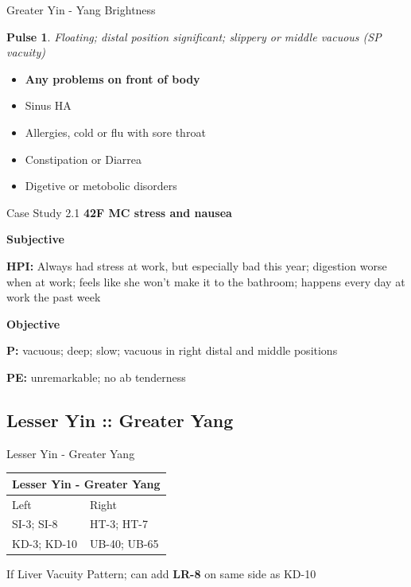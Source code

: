\begin{frame}{Greater Yin - Yang Brightness}
\newtheorem{pulse}{Pulse}

\begin{pulse}
Floating; distal position significant; slippery or middle vacuous (SP vacuity)
\end{pulse}

\begin{itemize}
\item \textbf{Any problems on front of body}
\item Sinus HA
\item Allergies, cold or flu with sore throat
\item Constipation or Diarrea
\item Digetive or metobolic disorders
\end{itemize}

\end{frame}

\begin{frame}{Case Study 2.1}
  \textbf{\Large 42F MC stress and nausea}
  
  \textbf{\large Subjective}
  
  \textbf{HPI:} Always had stress at work, but especially bad this year; digestion worse when at work; feels like she won't make it to the bathroom; happens every day at work the past week

  \textbf{\large Objective}
  
  \textbf{P:} vacuous; deep; slow; vacuous in right distal and middle positions

  \textbf{PE:} unremarkable; no ab tenderness

\end{frame}

\subsection{Lesser Yin :: Greater Yang}

\begin{frame}{Lesser Yin - Greater Yang}

\begin{table}[]
\begin{tabular}{@{}ll@{}}
\toprule
\multicolumn{2}{l}{Lesser Yin - Greater Yang} \\ \midrule
Left                  & Right                 \\
SI-3; SI-8            & HT-3; HT-7            \\
KD-3; KD-10           & UB-40; UB-65          \\ \bottomrule
\end{tabular}
\end{table}

\vspace{2em}

If Liver Vacuity Pattern; can add \textbf{LR-8} on same side as KD-10

\end{frame}

